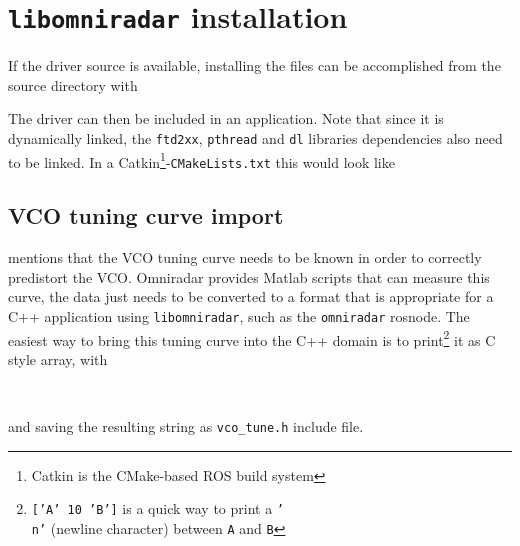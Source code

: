 \chapter{\texttt{libomniradar} installation} \label{install}

If the driver source is available, installing the files can be
accomplished from the source directory with

\begin{Shaded}
\begin{Highlighting}[]
\KeywordTok{\&\&} 
\end{Highlighting}
\end{Shaded}

The driver can then be included in an application. Note that since it is
dynamically linked, the \texttt{ftd2xx}, \texttt{pthread} and
\texttt{dl} libraries dependencies also need to be linked. In a Catkin\footnote{Catkin is the CMake-based ROS build system}-\texttt{CMakeLists.txt}
this would look like

\begin{Shaded}
\begin{Highlighting}[]
\NormalTok{(}
\NormalTok{)}
\end{Highlighting}
\end{Shaded}

\section{VCO tuning curve import} \label{vcotune}

 mentions that the VCO tuning curve needs to be known in order to correctly predistort the VCO.
Omniradar provides Matlab scripts that can measure this curve, the data just needs to be converted to a format that is appropriate for a C++ application using \texttt{libomniradar}, such as the \texttt{omniradar} rosnode.
The easiest way to bring this tuning curve into the C++ domain is to
print\footnote{\texttt{['A' 10 'B']} is a quick way to print a \texttt{'\\n'} (newline character) between \texttt{A} and \texttt{B}}
it as C style array, with

\begin{Shaded}
\begin{Highlighting}[]
\NormalTok{[ }    \\
\NormalTok{    }\NormalTok{ ]}
\end{Highlighting}
\end{Shaded}

and saving the resulting string as \texttt{vco\_tune.h} include
file.
